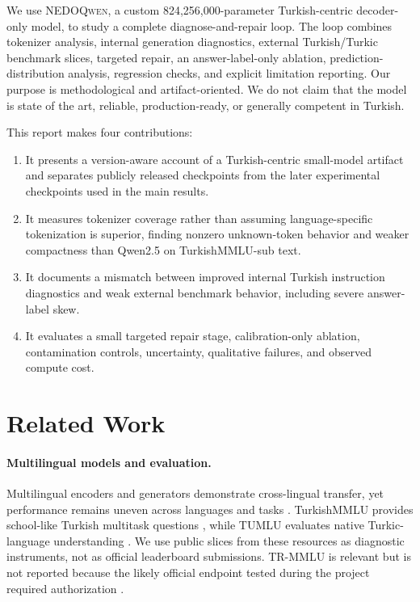 \documentclass[11pt]{article}
\newcommand{\model}{\textsc{NEDOQwen}}
\newcommand{\tmmlu}{TurkishMMLU-sub}
\begin{document}
We use \model, a custom 824,256,000-parameter Turkish-centric decoder-only
model, to study a complete diagnose-and-repair loop. The loop combines
tokenizer analysis, internal generation diagnostics, external Turkish/Turkic
benchmark slices, targeted repair, an answer-label-only ablation, prediction-
distribution analysis, regression checks, and explicit limitation reporting.
Our purpose is methodological and artifact-oriented. We do not claim that the
model is state of the art, reliable, production-ready, or generally competent
in Turkish.

This report makes four contributions:
\begin{enumerate}
  \item It presents a version-aware account of a Turkish-centric small-model
  artifact and separates publicly released checkpoints from the later
  experimental checkpoints used in the main results.
  \item It measures tokenizer coverage rather than assuming language-specific
  tokenization is superior, finding nonzero unknown-token behavior and weaker
  compactness than Qwen2.5 on \tmmlu{} text.
  \item It documents a mismatch between improved internal Turkish instruction
  diagnostics and weak external benchmark behavior, including severe answer-
  label skew.
  \item It evaluates a small targeted repair stage, calibration-only ablation,
  contamination controls, uncertainty, qualitative failures, and observed
  compute cost.
\end{enumerate}

\section{Related Work}

\paragraph{Multilingual models and evaluation.}
Multilingual encoders and generators demonstrate cross-lingual transfer, yet
performance remains uneven across languages and tasks
\citep{conneau2020xlmr,scao2022bloom,yang2024qwen25}. TurkishMMLU provides
school-like Turkish multitask questions \citep{yuksel2024turkishmmlu}, while
TUMLU evaluates native Turkic-language understanding \citep{isbarov2025tumlu}.
We use public slices from these resources as diagnostic instruments, not as
official leaderboard submissions. TR-MMLU is relevant but is not reported
because the likely official endpoint tested during the project required
authorization \citep{bayram2025trmmlu}.
\end{document}
